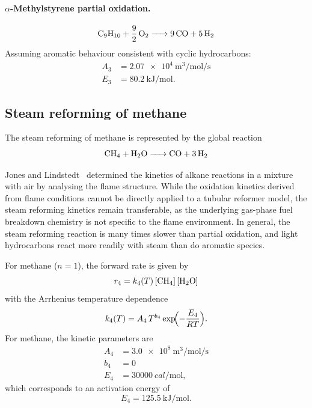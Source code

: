 \paragraph{\(\alpha\)-Methylstyrene partial oxidation.}
%
\begin{equation}
  \ce{C9H10 + \frac{9}{2} O2 -> 9 CO + 5 H2}
  \label{eq:rxn3}
\end{equation}
%
Assuming aromatic behaviour consistent with cyclic hydrocarbons:
%
\begin{align}
  A_3 &= \SI{2.07e4}{\metre\cubed\per\mole\per\second} \label{eq:A3} \\
  E_3 &= \SI{80.2}{\kilo\joule\per\mole}. \label{eq:E3}
\end{align}

\subsection{Steam reforming of methane}\label{ssec:steam_reforming_CH4}

The steam reforming of methane is represented by the global reaction
%
\begin{equation}
  \ce{CH4 + H2O -> CO + 3 H2}
  \label{eq:rxn4}
\end{equation}

Jones and Lindstedt~\cite{JonesLindstedt1988} determined the kinetics of alkane reactions in a mixture with air by analysing the flame structure. While the oxidation kinetics derived from flame conditions cannot be directly applied to a tubular reformer model, the steam reforming kinetics remain transferable, as the underlying gas-phase fuel breakdown chemistry is not specific to the flame environment. In general, the steam reforming reaction is many times slower than partial oxidation, and light hydrocarbons react more readily with steam than do aromatic species.

For methane (\(n = 1\)), the forward rate is given by
%
\begin{equation}
  r_4 = k_4(T)\,[\ce{CH4}]\,[\ce{H2O}]
  \label{eq:rate4}
\end{equation}
%
with the Arrhenius temperature dependence
%
\begin{equation}
  k_4(T) = A_4\, T^{b_4} \exp\!\Bigl(-\frac{E_4}{RT}\Bigr).
  \label{eq:k4}
\end{equation}
%
For methane, the kinetic parameters are
%
\begin{align}
  A_4 &= \SI{3.0e8}{\metre\cubed\per\mole\per\second} \label{eq:A4} \\
  b_4 &= 0 \label{eq:b4} \\
  E_4 &= \SI{30000}{cal\per\mole}, \label{eq:E4_cal}
\end{align}
%
which corresponds to an activation energy of
%
\begin{equation}
  E_4 = \SI{125.5}{\kilo\joule\per\mole}.
  \label{eq:E4}
\end{equation}

